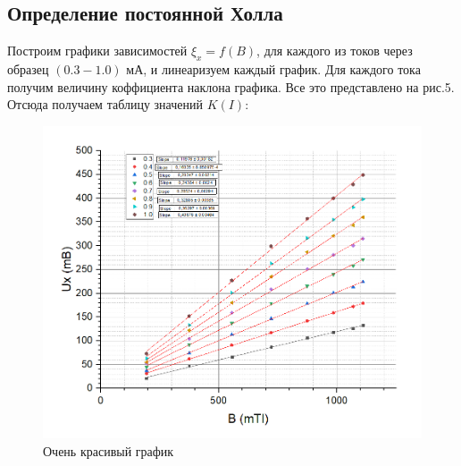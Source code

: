 \documentclass[a4paper, 14pt]{extarticle}%
\newcommand\ECaption[1]{%
     \captionsetup{font=footnotesize}%
     \caption{#1}}
\begin{document}
\subsection*{Определение постоянной Холла}
Построим графики зависимостей $\xi_x=f(B)$, для каждого из токов через образец $(0.3-1.0)$ мА, и линеаризуем каждый график. Для каждого тока получим величину коффициента наклона графика. Все это представлено на рис.5. Отсюда получаем таблицу значений $K(I)$:
\begin{figure}[h!]
\begin{center}
\includegraphics[width=1\textwidth]{grbu}
\end{center}
\ECaption{Очень красивый график}
\end{figure}
\end{document}
